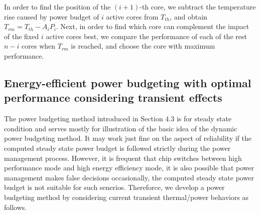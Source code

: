 In order to find the position of the $(i+1)$-th core, we subtract the
temperature rise caused by power budget of $i$ active cores from $T_{th}$,
and obtain $T_{rm}=T_{th}-A_iP_i$. Next, in order to find which core can complement the impact of the fixed $i$ active cores best, we compare the performance of each of the rest $n-i$ cores when $T_{rm}$ is reached, and choose the core with maximum performance.




\subsection{Energy-efficient power budgeting with optimal performance considering transient effects}
The power budgeting method introduced in Section $4.3$ is for steady state condition and serves mostly for illustration of the basic idea of the dynamic power budgeting method. It may work just fine on the aspect of reliability if the computed steady state power budget is followed strictly during the power management process. However, it is frequent that chip switches between high performance mode and high energy efficiency mode, it is also possible that power management makes false decisions occasionally, the computed steady state power budget is not suitable for such senerios. Thereforce, we develop a power budgeting method by considering current transient thermal/power behaviors as follows.

